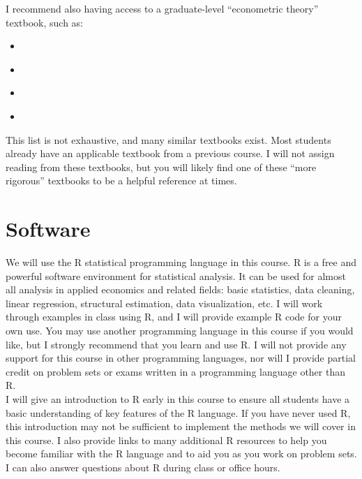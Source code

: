 \documentclass[11pt,letterpaper]{article}
\begin{document}
\noindent I recommend also having access to a graduate-level ``econometric theory'' textbook, such as:
\begin{itemize}
	\item[] \begin{refsection} \nocite{cameronMicroeconometricsMethodsApplications2005} \printbibliography[heading=none] \end{refsection}
  \item[] \begin{refsection} \nocite{greeneEconometricAnalysis2018} \printbibliography[heading=none] \end{refsection}
  \item[] \begin{refsection} \nocite{hayashiEconometrics2000} \printbibliography[heading=none] \end{refsection}
	\item[] \begin{refsection} \nocite{wooldridgeEconomtericAnalysisCross2010} \printbibliography[heading=none] \end{refsection}
\end{itemize}
This list is not exhaustive, and many similar textbooks exist. Most students already have an applicable textbook from a previous course. I will not assign reading from these textbooks, but you will likely find one of these ``more rigorous'' textbooks to be a helpful reference at times.

\section*{Software}

We will use the R statistical programming language in this course. R is a free and powerful software environment for statistical analysis. It can be used for almost all analysis in applied economics and related fields: basic statistics, data cleaning, linear regression, structural estimation, data visualization, etc. I will work through examples in class using R, and I will provide example R code for your own use. You may use another programming language in this course if you would like, but I strongly recommend that you learn and use R. I will not provide any support for this course in other programming languages, nor will I provide partial credit on problem sets or exams written in a programming language other than R. \\

\noindent I will give an introduction to R early in this course to ensure all students have a basic understanding of key features of the R language. If you have never used R, this introduction may not be sufficient to implement the methods we will cover in this course. I also provide links to many additional R resources to help you become familiar with the R language and to aid you as you work on problem sets. I can also answer questions about R during class or office hours.
\end{document}
